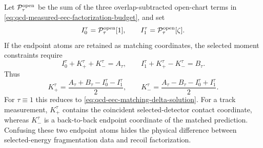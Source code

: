 Let \(\mathcal P_{\tau}^{\rm open}\) be the sum of the three
overlap-subtracted open-chart terms in
\eqref{eq:qcd-measured-eec-factorization-budget}, and set
\[
  I_0^\tau=\mathcal P_{\tau}^{\rm open}[1],
  \qquad
  I_1^\tau=\mathcal P_{\tau}^{\rm open}[\zeta].
\]
If the endpoint atoms are retained as matching coordinates, the selected
moment constraints require
\begin{equation}
  I_0^\tau+K_+^\tau+K_-^\tau=A_\tau,
  \qquad
  I_1^\tau+K_+^\tau-K_-^\tau=B_\tau .
  \label{eq:qcd-selected-eec-endpoint-matching-equations}
\end{equation}
Thus
\begin{equation}
  K_+^\tau
  =
  \frac{A_\tau+B_\tau-I_0^\tau-I_1^\tau}{2},
  \qquad
  K_-^\tau
  =
  \frac{A_\tau-B_\tau-I_0^\tau+I_1^\tau}{2}.
  \label{eq:qcd-selected-eec-endpoint-atom-solution}
\end{equation}
For \(\tau\equiv1\) this reduces to
\eqref{eq:qcd-eec-matching-delta-solution}.  For a track measurement,
\(K_+^\tau\) contains the coincident selected-detector contact coordinate,
whereas \(K_-^\tau\) is a back-to-back endpoint coordinate of the matched
prediction.  Confusing these two endpoint atoms hides the physical difference
between selected-energy fragmentation data and recoil factorization.

